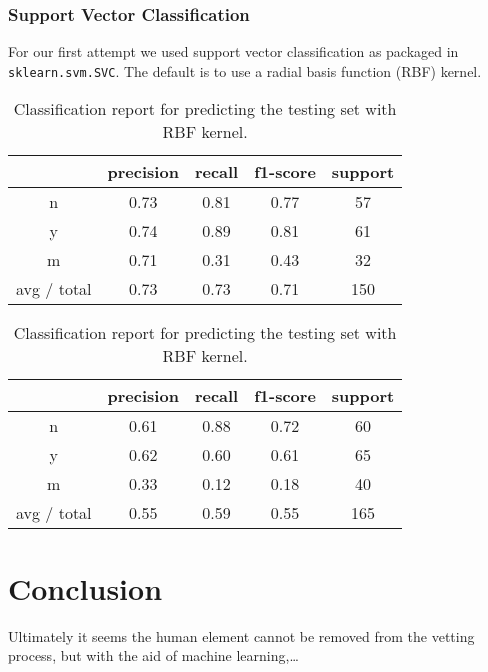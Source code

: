 \documentclass[11pt]{article}
\begin{document}
\subsubsection{Support Vector Classification}
\label{sec:linear}
For our first attempt we used support vector classification as
packaged in \verb|sklearn.svm.SVC|.  The default is to use a radial
basis function (RBF) kernel.
\begin{table}
  \centering
  \begin{tabular}[h!]{c|c c c c}
                & precision &recall &f1-score &support \\ \hline
    n           & 0.73      &0.81   &0.77     &57      \\
    y           & 0.74      &0.89   &0.81     &61      \\
    m           & 0.71      &0.31   &0.43     &32      \\ \hline
    avg / total & 0.73      &0.73   &0.71     &150     \\
  \end{tabular}
  \caption{Reconstructing the training set (150 flares total) with RBF kernel.}

  \begin{tabular}[h!]{c|c c c c}
                & precision &recall &f1-score &support \\ \hline
    n           & 0.61      &0.88   &0.72     &60      \\
    y           & 0.62      &0.60   &0.61     &65      \\
    m           & 0.33      &0.12   &0.18     &40      \\ \hline
    avg / total & 0.55      &0.59   &0.55     &165     \\
  \end{tabular}
  \caption{Classification report for predicting the testing set
    with RBF kernel.}


\end{table}

\section{Conclusion}
\label{sec:conc}
Ultimately it seems the human element cannot be removed from the
vetting process, but with the aid of machine learning,\ldots
\end{document}
